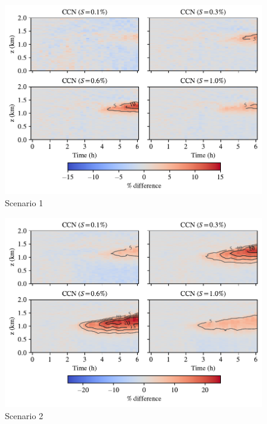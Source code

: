 \newpage
\begin{figure}[h]
  \centering
    \includegraphics[width=\textwidth]{figures/chapter5/height-time-ccn-pdiff-fx1fy0.pdf}
    \caption{Scenario 1}
    \label{fig:ht-ccn-pdiff-s1}
\end{figure}

\newpage
\begin{figure}[h]
  \centering
    \includegraphics[width=\textwidth]{figures/chapter5/height-time-ccn-pdiff-road-10x.pdf}
    \caption{Scenario 2}
    \label{fig:ht-ccn-pdiff-s2}
\end{figure}

